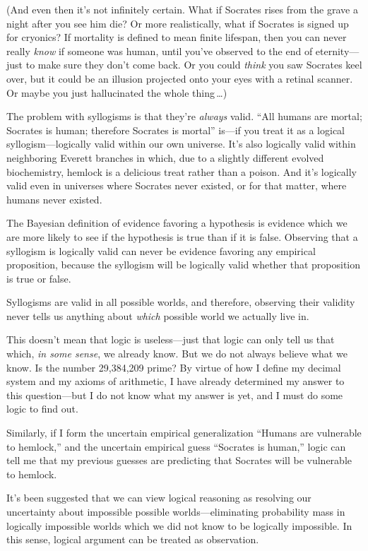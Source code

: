 { (And even then it's not infinitely certain. What
if Socrates rises from the grave a night after you see him die? Or more
realistically, what if Socrates is signed up for cryonics? If mortality
is defined to mean finite lifespan, then you can never really
\textit{know} if someone was human, until you've
observed to the end of eternity---just to make sure they
don't come back. Or you could \textit{think} you saw
Socrates keel over, but it could be an illusion projected onto your
eyes with a retinal scanner. Or maybe you just hallucinated the whole
thing\,\ldots)


 The problem with syllogisms is that they're
\textit{always} valid. ``All humans are mortal;
Socrates is human; therefore Socrates is mortal''
is---if you treat it as a logical syllogism---logically valid within
our own universe. It's also logically valid within
neighboring Everett branches in which, due to a slightly different
evolved biochemistry, hemlock is a delicious treat rather than a
poison. And it's logically valid even in universes
where Socrates never existed, or for that matter, where humans never
existed.


 The Bayesian definition of evidence favoring a hypothesis is
evidence which we are more likely to see if the hypothesis is true than
if it is false. Observing that a syllogism is logically valid can never
be evidence favoring any empirical proposition, because the syllogism
will be logically valid whether that proposition is true or false.


 Syllogisms are valid in all possible worlds, and therefore,
observing their validity never tells us anything about \textit{which}
possible world we actually live in.


 This doesn't mean that logic is useless---just
that logic can only tell us that which, \textit{in some sense}, we
already know. But we do not always believe what we know. Is the number
29,384,209 prime? By virtue of how I define my decimal system and my
axioms of arithmetic, I have already determined my answer to this
question---but I do not know what my answer is yet, and I must do some
logic to find out.


 Similarly, if I form the uncertain empirical generalization
``Humans are vulnerable to
hemlock,'' and the uncertain empirical guess
``Socrates is human,'' logic can
tell me that my previous guesses are predicting that Socrates will be
vulnerable to hemlock.


 It's been suggested that we can view logical
reasoning as resolving our uncertainty about impossible possible
worlds---eliminating probability mass in logically impossible worlds
which we did not know to be logically impossible. In this sense,
logical argument can be treated as observation.


}
